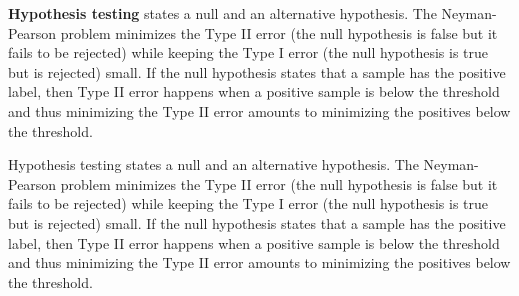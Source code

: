 
\textbf{Hypothesis testing} states a null and an alternative hypothesis. The Neyman-Pearson problem minimizes the Type II error (the null hypothesis is false but it fails to be rejected) while keeping the Type I error (the null hypothesis is true but is rejected) small. If the null hypothesis states that a sample has the positive label, then Type II error happens when a positive sample is below the threshold and thus minimizing the Type II error amounts to minimizing the positives below the threshold.

Hypothesis testing states a null and an alternative hypothesis. The Neyman-Pearson problem minimizes the Type II error (the null hypothesis is false but it fails to be rejected) while keeping the Type I error (the null hypothesis is true but is rejected) small. If the null hypothesis states that a sample has the positive label, then Type II error happens when a positive sample is below the threshold and thus minimizing the Type II error amounts to minimizing the positives below the threshold.